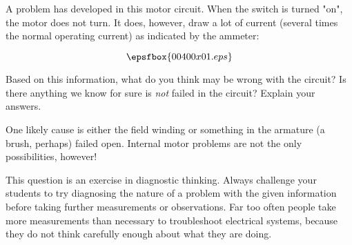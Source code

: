 

A problem has developed in this motor circuit.  When the switch is turned "on", the motor does not turn.  It does, however, draw a lot of current (several times the normal operating current) as indicated by the ammeter:

$$\epsfbox{00400x01.eps}$$

Based on this information, what do you think may be wrong with the circuit?  Is there anything we know for sure is {\it not} failed in the circuit?  Explain your answers.







One likely cause is either the field winding or something in the armature (a brush, perhaps) failed open.  Internal motor problems are not the only possibilities, however!







This question is an exercise in diagnostic thinking.  Always challenge your students to try diagnosing the nature of a problem with the given information before taking further measurements or observations.  Far too often people take more measurements than necessary to troubleshoot electrical systems, because they do not think carefully enough about what they are doing.




